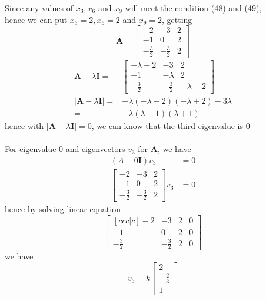 \documentclass[12pt]{article}
\newcommand{\matr}[1]{\bm{#1}}
\begin{document}
Since any values of $x_3,x_6$ and $x_9$ will meet the condition (48) and (49), \\
hence we can put $x_3=2, x_6=2$ and $x_9=2$, getting
\begin{equation}
	\matr A = \left[\begin{matrix}-2 & -3 & 2\\-1 & 0 & 2\\- \frac{3}{2} & - \frac{3}{2} & 2\end{matrix}\right]
\end{equation}
\begin{align}
	\matr A-\lambda \matr I  = & \left[\begin{matrix}- \lambda - 2 & -3 & 2 \\-1 & - \lambda & 2\\- \frac{3}{2} & - \frac{3}{2} & - \lambda + 2\end{matrix}\right] \\
	|\matr A - \lambda \matr I|=& - \lambda \left(- \lambda - 2\right) \left(- \lambda + 2\right) - 3 \lambda \\
	=&-\lambda(\lambda-1)(\lambda+1)
\end{align}
hence with $|\matr A - \lambda \matr I|=0$, we can know that the third eigenvalue is $0$ \\ \\
For eigenvalue $0$ and eigenvectors $v_3$ for $\matr A$, we have
\begin{align}
	\left(A-0\matr I \right) v_3 &= 0 \\
	\left[\begin{matrix}-2 & -3 & 2 \\-1 & 0 & 2\\- \frac{3}{2} & - \frac{3}{2} & 2\end{matrix}\right] v_3 &= 0 
\end{align}
hence by solving linear equation
\begin{equation}
	\begin{bmatrix}[ccc|c]
		-2 & -3 & 2 & 0 \\-1 & 0 & 2 & 0\\- \frac{3}{2} & - \frac{3}{2} & 2 & 0
	\end{bmatrix}
\end{equation}
we have 
\begin{equation}
	v_3 = k \begin{bmatrix}
	2 \\ -\frac 2 3 \\ 1
	\end{bmatrix}
\end{equation}
\end{document}

